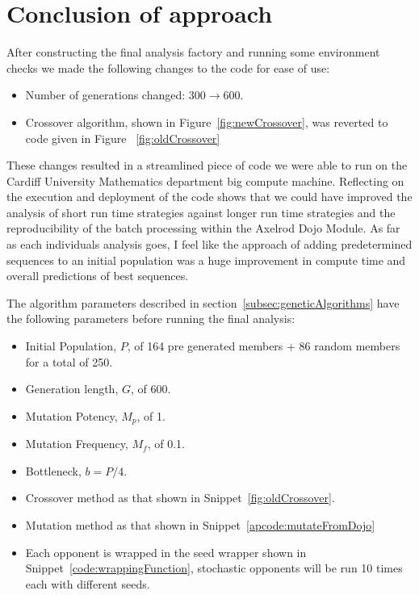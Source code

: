 \section{Conclusion of approach}\label{sec:conclusionOfApproach}
After constructing the final analysis factory and running some environment checks we made the following changes to the code for ease of use:
\begin{itemize}
    \item Number of generations changed: $300\rightarrow600$.
    \item Crossover algorithm, shown in Figure~\ref{fig:newCrossover}, was reverted to code given in Figure ~\ref{fig:oldCrossover}
\end{itemize}

These changes resulted in a streamlined piece of code we were able to run on the Cardiff University Mathematics department big compute machine.
Reflecting on the execution and deployment of the code shows that we could have improved the analysis of short run time strategies against longer run time strategies and the reproducibility of the batch processing within the Axelrod Dojo Module.
As far as each individuals analysis goes, I feel like the approach of adding predetermined sequences to an initial population was a huge improvement in compute time and overall predictions of best sequences. 

The algorithm parameters described in section~\ref{subsec:geneticAlgorithms} have the following parameters before running the final analysis:
\begin{itemize}
    \item Initial Population, $P$, of 164 pre generated members + 86 random members for a total of 250.
    \item Generation length, $G$, of 600.
    \item Mutation Potency, $M_p$, of 1.
    \item Mutation Frequency, $M_f$, of 0.1.
    \item Bottleneck, $b=P/4$.
    \item Crossover method as that shown in Snippet~\ref{fig:oldCrossover}.
    \item Mutation method as that shown in Snippet~\ref{apcode:mutateFromDojo}
    \item Each opponent is wrapped in the seed wrapper shown in Snippet~\ref{code:wrappingFunction}, stochastic opponents will be run 10 times each with different seeds.
\end{itemize}